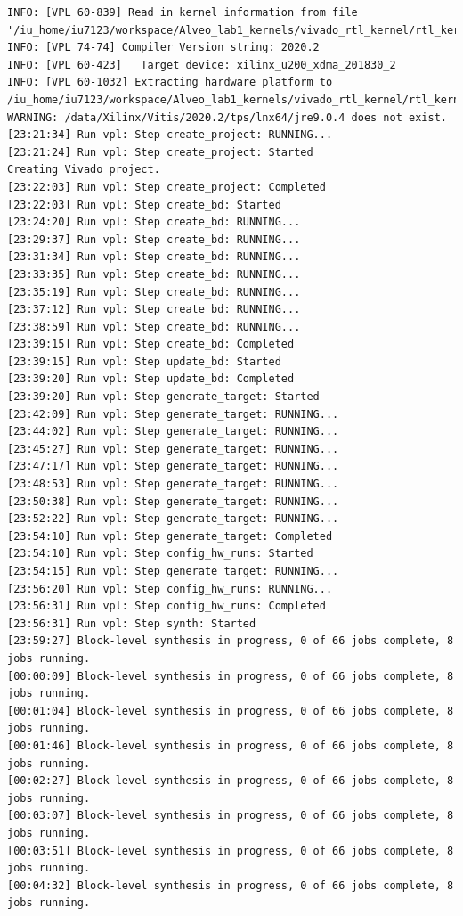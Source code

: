 \begin{lstlisting}
INFO: [VPL 60-839] Read in kernel information from file '/iu_home/iu7123/workspace/Alveo_lab1_kernels/vivado_rtl_kernel/rtl_kernel_wizard_2_ex/exports/_x/link/int/kernel_info.dat'.
INFO: [VPL 74-74] Compiler Version string: 2020.2
INFO: [VPL 60-423]   Target device: xilinx_u200_xdma_201830_2
INFO: [VPL 60-1032] Extracting hardware platform to /iu_home/iu7123/workspace/Alveo_lab1_kernels/vivado_rtl_kernel/rtl_kernel_wizard_2_ex/exports/_x/link/vivado/vpl/.local/hw_platform
WARNING: /data/Xilinx/Vitis/2020.2/tps/lnx64/jre9.0.4 does not exist.
[23:21:34] Run vpl: Step create_project: RUNNING...
[23:21:24] Run vpl: Step create_project: Started
Creating Vivado project.
[23:22:03] Run vpl: Step create_project: Completed
[23:22:03] Run vpl: Step create_bd: Started
[23:24:20] Run vpl: Step create_bd: RUNNING...
[23:29:37] Run vpl: Step create_bd: RUNNING...
[23:31:34] Run vpl: Step create_bd: RUNNING...
[23:33:35] Run vpl: Step create_bd: RUNNING...
[23:35:19] Run vpl: Step create_bd: RUNNING...
[23:37:12] Run vpl: Step create_bd: RUNNING...
[23:38:59] Run vpl: Step create_bd: RUNNING...
[23:39:15] Run vpl: Step create_bd: Completed
[23:39:15] Run vpl: Step update_bd: Started
[23:39:20] Run vpl: Step update_bd: Completed
[23:39:20] Run vpl: Step generate_target: Started
[23:42:09] Run vpl: Step generate_target: RUNNING...
[23:44:02] Run vpl: Step generate_target: RUNNING...
[23:45:27] Run vpl: Step generate_target: RUNNING...
[23:47:17] Run vpl: Step generate_target: RUNNING...
[23:48:53] Run vpl: Step generate_target: RUNNING...
[23:50:38] Run vpl: Step generate_target: RUNNING...
[23:52:22] Run vpl: Step generate_target: RUNNING...
[23:54:10] Run vpl: Step generate_target: Completed
[23:54:10] Run vpl: Step config_hw_runs: Started
[23:54:15] Run vpl: Step generate_target: RUNNING...
[23:56:20] Run vpl: Step config_hw_runs: RUNNING...
[23:56:31] Run vpl: Step config_hw_runs: Completed
[23:56:31] Run vpl: Step synth: Started
[23:59:27] Block-level synthesis in progress, 0 of 66 jobs complete, 8 jobs running.
[00:00:09] Block-level synthesis in progress, 0 of 66 jobs complete, 8 jobs running.
[00:01:04] Block-level synthesis in progress, 0 of 66 jobs complete, 8 jobs running.
[00:01:46] Block-level synthesis in progress, 0 of 66 jobs complete, 8 jobs running.
[00:02:27] Block-level synthesis in progress, 0 of 66 jobs complete, 8 jobs running.
[00:03:07] Block-level synthesis in progress, 0 of 66 jobs complete, 8 jobs running.
[00:03:51] Block-level synthesis in progress, 0 of 66 jobs complete, 8 jobs running.
[00:04:32] Block-level synthesis in progress, 0 of 66 jobs complete, 8 jobs running.

\end{lstlisting}
